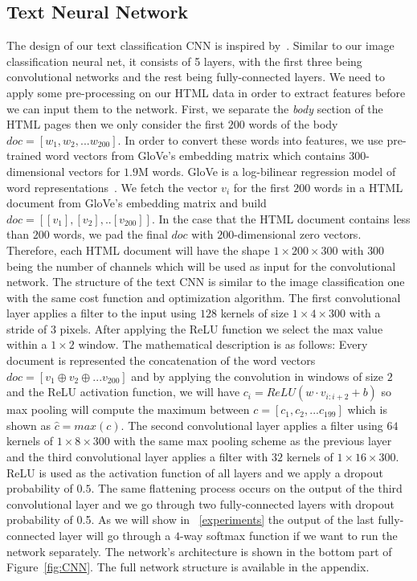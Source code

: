 \documentclass{article} %
\begin{document}
\subsection{Text Neural Network}
The design of our text classification CNN is inspired by~\cite{convtext}. Similar to our image classification neural net, it consists of 5 layers, with the first three being convolutional networks and the rest being fully-connected layers. We need to apply some pre-processing on our HTML data in order to extract features before we can input them to the network. First, we separate the \textit{body} section of the HTML pages then we only consider the first $200$ words of the body $doc=[w_1,w_2,...w_{200}]$. In order to convert these words into features, we use pre-trained word vectors from GloVe's embedding matrix which contains 300-dimensional vectors for $1.9$M words. GloVe is a log-bilinear regression model of word representations~\cite{glove}. We fetch the vector $v_i$ for the first $200$ words in a HTML document from GloVe's embedding matrix and build $doc = [[v_1],[v_2],..[v_{200}]]$. In the case that the HTML document contains less than $200$ words, we pad the final $doc$ with $200$-dimensional zero vectors. Therefore, each HTML document will have the shape $1\times200\times300$ with $300$ being the number of channels which will be used as input for the convolutional network. The structure of the text CNN is similar to the image classification one with the same cost function and optimization algorithm. The first convolutional layer applies a filter to the input using $128$ kernels of size $1\times4\times300$ with a stride of $3$ pixels. After applying the ReLU function we select the max value within a $1\times2$ window. The mathematical description is as follows:
Every document is represented the concatenation of the word vectors $doc = [v_1 \oplus v_2 \oplus ... v_{200}]$ and by applying the convolution in windows of size $2$ and the ReLU activation function, we will have $c_i = ReLU(w\cdot v_{i:i+2} +b)$ so max pooling will compute the maximum between $c = [c_1, c_2, ... c_{199}]$ which is shown as $\hat{c} = max(c)$.
The second convolutional layer applies a filter using $64$ kernels of $1\times8\times300$ with the same max pooling scheme as the previous layer and the third convolutional layer applies a filter with $32$ kernels of $1\times16\times300$. ReLU is used as the activation function of all layers and we apply a dropout probability of $0.5$. The same flattening process occurs on the output of the third convolutional layer and we go through two fully-connected layers with dropout probability of 0.5. As we will show in ~\ref{experiments} the output of the last fully-connected layer will go through a $4$-way softmax function if we want to run the network separately. The network's architecture is shown in the bottom part of Figure~\ref{fig:CNN}. The full network structure is available in the appendix.
\end{document}
